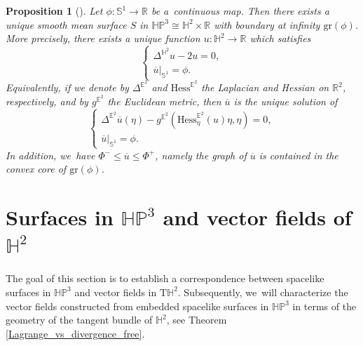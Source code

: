 \documentclass[JEP,XML,SOM,Unicode,NoEqCountersInSection, NoFloatCountersInSection,published]{cedram}
\theoremstyle{plain}
\newtheorem{prop}[cor]{Proposition}
\theoremstyle{definition}
\newcommand{\HP}{\mathbb{HP}^3}
\begin{document}
\begin{prop}[{\cite[p.\,668, Prop.\,16.2.37, Lem.\,6.2.42]{barbotfillastre}}]\label{BF_platau_HP}
Let $\phi:\mathbb{S}^1\to\mathbb{R}$ be a~continuous map. Then there exists a unique smooth mean surface $S$ in $\HP\cong\mathbb{H}^2\times\mathbb{R}$ with boundary at infinity $\mathrm{gr}(\phi)$. More precisely, there exists a unique function $u:\mathbb{H}^2\to\mathbb{R}$ which satisfies
\begin{equation}\label{platau_HP}
\begin{cases}
\Delta^{\mathbb{H}^2} u-2u=0, \\
\overline{u}|_{\mathbb{S}^1}=\phi.
\end{cases}\end{equation}
Equivalently, if we denote by \(\Delta^{\mathbb{E}^2}\) and \(\mathrm{Hess}^{\mathbb{E}^2}\) the Laplacian and Hessian on \(\mathbb{R}^2\), respectively, and by \(g^{\mathbb{E}^2}\) the Euclidean metric, then \(\overline{u}\) is the unique solution of \begin{equation}\label{platau_HPE}
\begin{cases}
\Delta^{\mathbb{E}^2}\overline{u}(\eta)-g^{\mathbb{E}^2}(\mathrm{Hess}_{\eta}^{\mathbb{E}^2}(u)\eta,\eta)=0, \\
\overline{u}|_{\mathbb{S}^1}=\phi.
\end{cases}\end{equation}
In addition, we~have $\Phi^-\leq\overline{u}\leq \Phi^+$, namely the graph of $\overline{u}$ is contained in the convex core of $\mathrm{gr}(\phi)$.
\end{prop}

\section{Surfaces in \texorpdfstring{$\HP$}{HP} and vector fields of \texorpdfstring{$\mathbb{H}^2$}{H2}}
\label{sec4_correpondance}
The goal of this section is to establish a correspondence between spacelike surfaces in $\HP$ and vector fields in $\mathrm{T}\mathbb{H}^2$. Subsequently, we~will characterize the vector fields constructed from embedded spacelike surfaces in $\HP$ in terms of the geometry of the tangent bundle of $\mathbb{H}^2$, see Theorem \ref{Lagrange_vs_divergence_free}.
\end{document}
